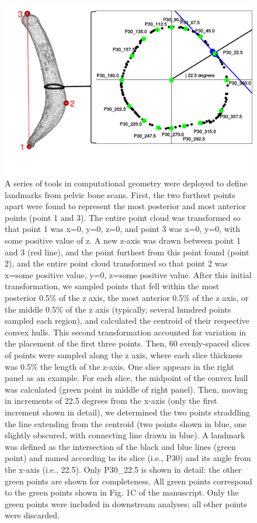 \documentclass[12pt]{article}
\begin{document}
\begin{figure}
\begin{center}
  \includegraphics[width=\textwidth]{S3}
\end{center}
\caption{
A series of tools in computational geometry were deployed to define landmarks from pelvic bone scans.  First, the two furthest points apart were found to represent the most posterior and most anterior points (point 1 and 3).  The entire point cloud was transformed so that point 1 was x=0, y=0, z=0, and point 3 was x=0, y=0, with some positive value of z.  A new z-axis was drawn between point 1 and 3 (red line), and the point furthest from this point found (point 2), and the entire point cloud transformed so that point 2 was x=some positive value, y=0, z=some positive value.  After this initial transformation, we sampled points that fell within the most posterior 0.5\% of the z axis, the most anterior 0.5\% of the z axis, or the middle 0.5\% of the z axis (typically, several hundred points sampled each region), and calculated the centroid of their respective convex hulls.  This second transformation accounted for variation in the placement of the first three points.  Then, 60 evenly-spaced slices of points were sampled along the z axis, where each slice thickness was 0.5\% the length of the z-axis.  One slice appears in the right panel as an example.  For each slice, the midpoint of the convex hull was calculated (green point in middle of right panel).  Then, moving in increments of 22.5 degrees from the x-axis (only the first increment shown in detail), we determined the two points straddling the line extending from the centroid (two points shown in blue, one slightly obscured, with connecting line drawn in blue).  A landmark was defined as the intersection of the black and blue lines (green point) and named according to its slice (i.e., P30) and its angle from the x-axis (i.e., 22.5).  Only P30\_22.5 is shown in detail: the other green points are shown for completeness.  All green points correspond to the green points shown in Fig. 1C of the manuscript.  Only the green points were included in downstream analyses; all other points were discarded.
}
\end{figure}
\end{document}
